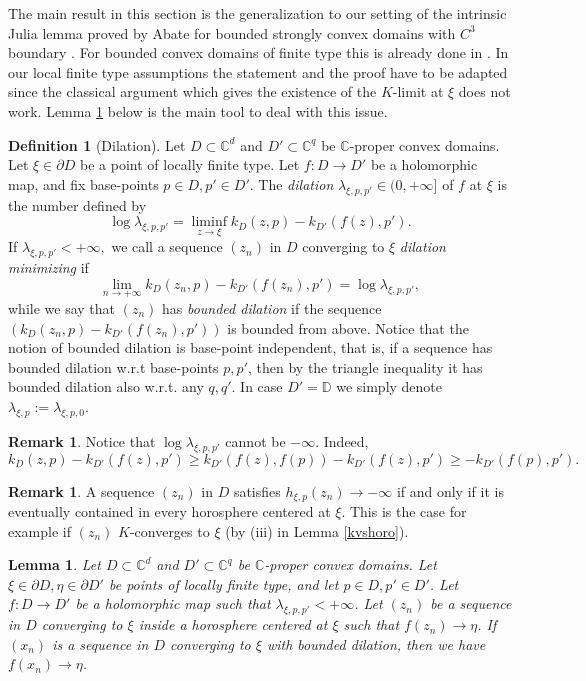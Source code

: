 \documentclass[11pt, reqno]{amsart}
\numberwithin{equation}{section}
\newtheorem{lemma}[theorem]{Lemma}
\theoremstyle{definition}
\newtheorem{remark}[theorem]{Remark}
\newtheorem{definition}[theorem]{Definition}
\newcommand{\C}{\mathbb{C}}
\newcommand{\D}{\mathbb{D}}
\begin{document}
{{{		The main result in this section is the generalization to our setting of the intrinsic Julia lemma proved by Abate for bounded strongly convex domains with $C^3$ boundary \cite[Theorem 2.4.16, Proposition 2.7.15]{Abatebook}. For bounded convex domains of finite type  this is already done in \cite[Theorem 6.28]{AFGG}. In our local finite type assumptions the statement and the proof have to be adapted since the classical argument which gives the existence of the $K$-limit at $\xi$  does not work. 	 Lemma \ref{takescare} below is the main tool to deal with this issue.
		
		
		
		\begin{definition}[Dilation]
			Let $D\subset\C^d$ and $D'\subset\C^{q}$ be  $\C$-proper convex domains.  Let $\xi\in\partial D$ be a
			point of locally finite type.
			Let $f\colon D\to D'$ be a holomorphic map, and fix base-points $p\in D,p'\in D'$. The {\sl dilation} $\lambda_{\xi,p,p'}\in(0,+\infty]$ of $f$ at $\xi$ is the number defined by
			$$\log\lambda_{\xi,p,p'}=\liminf_{z\to\xi}k_D(z,p)-k_{D'}(f(z),p').$$
			If $\lambda_{\xi,p,p'}<+\infty,$ we call a sequence $(z_n)$ in $D$ converging to $\xi$  {\sl dilation minimizing}  if 
			$$\lim_{n\to+\infty}k_D(z_n,p)-k_{D'}(f(z_n),p')=\log\lambda_{\xi,p,p'},$$ while we say that  $(z_n)$ has {\sl bounded dilation} if the sequence $(k_D(z_n,p)-k_{D'}(f(z_n),p'))$ is bounded from above. Notice that the notion of bounded dilation is base-point independent, that is, if a sequence has bounded dilation w.r.t base-points $p,p'$, then by the triangle inequality it has bounded dilation also w.r.t. any $q,q'$.
			In  case $D'=\D$ we simply denote $\lambda_{\xi,p}:=\lambda_{\xi,p,0}$.
		\end{definition}
		\begin{remark}
			Notice that $\log\lambda_{\xi,p,p'}$ cannot be $-\infty$. Indeed,
			$$k_D(z,p)-k_{D'}(f(z),p')\geq k_{D'}(f(z),f(p))-k_{D'}(f(z),p')\geq- k_{D'}(f(p),p').$$
		\end{remark}
		
		
		
		
		
		
		\begin{remark}
			A sequence $(z_n)$ in $D$ satisfies  $h_{\xi,p}(z_n)\to -\infty$ if and only if 
			it is eventually contained in every horosphere centered at $\xi$.
			This is the case for example if $(z_n)$ $K$-converges to $\xi$ (by (iii) in Lemma \ref{kvshoro}).
		\end{remark}
		\begin{lemma}\label{takescare}
			Let $D\subset\C^d$ and $D'\subset\C^{q}$ be  $\C$-proper convex domains.  Let $\xi\in\partial D,\eta\in \partial D'$ be 
			points of locally finite type, and let $p\in D,p'\in D'$.
			Let $f\colon D\to D'$ be a holomorphic map such that  $\lambda_{\xi,p,p'}<+\infty$. Let $(z_n)$ be a sequence in $D$ converging to $\xi$ inside a horosphere centered at $\xi$ such that  $f(z_n)\to \eta$.
			If  $(x_n)$  is a  sequence  in $D$ converging to $\xi$  with bounded dilation, then we have $f(x_n)\to \eta$.
		\end{lemma}
		
}}}
\end{document}
